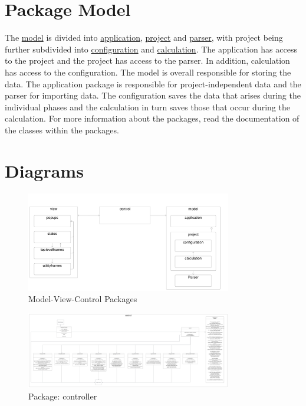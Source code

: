 \documentclass[letterpaper,10pt,english]{sphinxmanual}
\begin{document}
\section{Package Model}
The \hyperref[fig:model]{model} is divided into \hyperref[fig:application]{application}, \hyperref[fig:project]{project} and \hyperref[fig:parser]{parser}, with project being further subdivided into \hyperref[fig:configuration]{configuration} and \hyperref[fig:calculation]{calculation}. The application has access to the project and the project has access to the parser. In addition, calculation has access to the configuration. The model is overall responsible for storing the data. The application package is responsible for project-independent data and the parser for importing data. The configuration saves the data that arises during the individual phases and the calculation in turn saves those that occur during the calculation. For more information about the packages, read the documentation of the classes within the packages.

\section{Diagrams}

\hypertarget{mvc}{
\begin{figure}[hbt!]
  \centering
\includegraphics[width=0.8\textwidth]
        {pictures/mvc.png}
  \caption{Model-View-Control Packages}
  \label{fig:mvc}
\end{figure}
}

\hypertarget{controller}{
\begin{figure}[hbt!]
  \centering
\includegraphics[width=0.8\textwidth]
        {pictures/controller.png}
  \caption{Package: controller}
  \label{fig:controller}
\end{figure}
}
\end{document}
